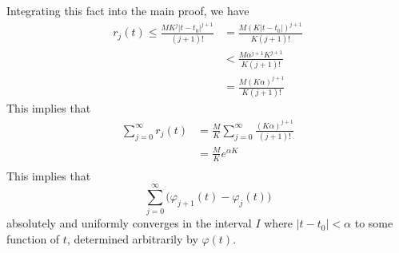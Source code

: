 \documentclass{article}
\begin{document}
    Integrating this fact into the main proof, we have
    \begin{align*}
        r_j (t) \leq \frac{M K^j |t - t_0|^{j+1}}{(j+1)!} & = \frac{M (K |t - t_0|)^{j+1}}{K (j+1)!}\\
        & < \frac{M \alpha^{j+1} K^{j+1}}{K (j+1)!} \\
        & = \frac{M (K \alpha)^{j+1}}{K (j+1)!} 
    \end{align*}
    This implies that
    \begin{align*}
        \sum_{j=0}^\infty r_j (t) & = \frac{M}{K} \sum_{j=0}^\infty \frac{ (K \alpha)^{j+1}}{(j+1)!} \\
        & = \frac{M}{K} e^{\alpha K} \\
    \end{align*}
    This implies that 
    \begin{equation}
      \sum_{j=0}^\infty \big( \varphi_{j+1} (t) - \varphi_{j} (t) \big)
    \end{equation}
    absolutely and uniformly converges in the interval $I$ where $|t - t_0| < \alpha$ to some function of $t$, determined arbitrarily by $\varphi (t)$. 
\end{document}
